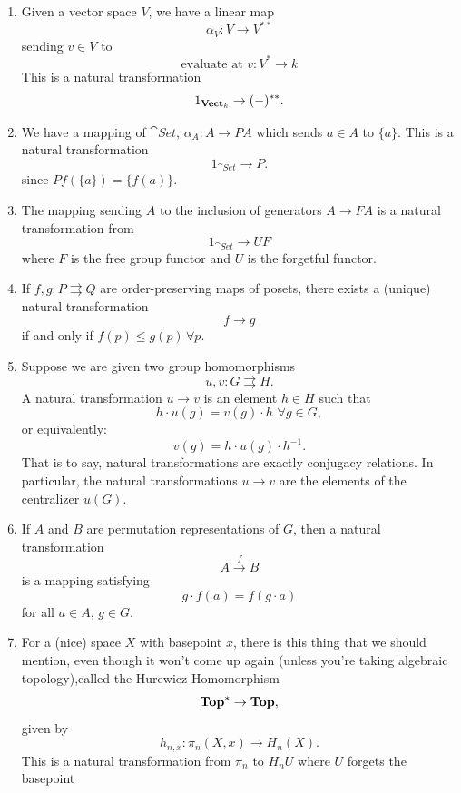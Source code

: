 \documentclass{article}
\begin{document}
\exs
\begin{enumerate}
    \item[(a)] Given a vector space $V$, we have a linear map \[ \alpha_{V} : V \to V^{**}\] sending $v \in V$ to \[ \text{evaluate at $v$} : V^{*} \to k\] This is a natural transformation \[ 1_{\textbf{Vect$_{k}$}} \to (-)^{**}.\]
    \item[(b)] We have a mapping of $\cat{Set}$, $\alpha_{A} : A \to PA$ which sends $a \in A$ to $\{ a \}$. This is a natural transformation \[ 1_{\cat{Set}} \to P.\] since $Pf(\{a\}) = \{f(a)\}$.
    \item[(c)] The mapping sending $A$ to the inclusion of generators $A \to FA$ is a natural transformation from \[ 1_{\cat{Set}} \to UF\] where $F$ is the free group functor and $U$ is the forgetful functor.
    \item[(d)] If $f,g : P \rightrightarrows Q$ are order-preserving maps of posets, there exists a (unique) natural transformation \[ f \to g\] if and only if $f(p) \leq g(p) \, \forall p$.
    \item[(e)] Suppose we are given two group homomorphisms \[ u,v: G \rightrightarrows H. \] A natural transformation $u \to v$ is an element $h \in H$ such that \[ h\cdot u(g) = v(g) \cdot h \, \, \forall g \in G, \] or equivalently: \[ v(g) = h \cdot u(g) \cdot h^{-1}.\] That is to say, natural transformations are exactly conjugacy relations. In particular, the natural transformations $u \to v$ are the elements of the centralizer $u(G)$.
    \item[(f)] If $A$ and $B$ are permutation representations of $G$, then a natural transformation \[ A \xrightarrow{f} B\] is a mapping satisfying \[ g \cdot f(a) = f(g \cdot a)\] for all $a \in A, \, g \in G$.
    \item[(h)] For a (nice) space $X$ with basepoint $x$, there is this thing that we should mention, even though it won't come up again (unless you're taking algebraic topology),called the Hurewicz Homomorphism \[ \textbf{Top$^{*}$} \to \textbf{Top}, \] given by \[ h_{n,x} : \pi_{n}(X,x) \to H_{n}(X).\] This is a natural transformation from $\pi_{n}$ to $H_{n}U$ where $U$ forgets the basepoint
\end{enumerate}












\newlec
\end{document}
